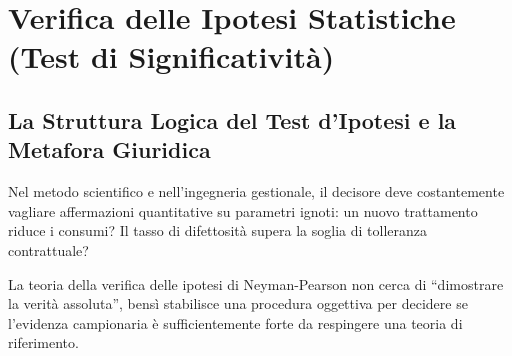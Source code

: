 \chapter{Verifica delle Ipotesi Statistiche (Test di Significatività)}
\label{cap:test_statistici}

\begin{abstract}
Il presente capitolo espone la teoria formale delle decisioni statistiche di Jerzy Neyman ed Egon Pearson. Si formalizza la dialettica tra ipotesi nulla ($H_0$) e ipotesi alternativa ($H_1$), chiarendo l'asimmetria ontologica tra le due posizioni mediante la celebre metafora giuridica del processo penale. Si analizza la matrice di contingenza degli errori decisionali (Errore di I tipo $\alpha$ ed Errore di II tipo $\beta$), definendo la funzione di potenza del test. Viene approfondito il concetto unificante di $p$-value e dimostrato il teorema di dualità strutturale che lega i test bilaterali agli intervalli di confidenza. Infine, si presenta la tassonomia operativa dei test parametrici $Z$ e $t$ per medie, proporzioni e confronti tra campioni indipendenti.
\end{abstract}

\section{La Struttura Logica del Test d'Ipotesi e la Metafora Giuridica}
\label{sec:struttura_logica_test}

Nel metodo scientifico e nell'ingegneria gestionale, il decisore deve costantemente vagliare affermazioni quantitative su parametri ignoti: un nuovo trattamento riduce i consumi? Il tasso di difettosità supera la soglia di tolleranza contrattuale? 

La teoria della verifica delle ipotesi di Neyman-Pearson non cerca di ``dimostrare la verità assoluta'', bensì stabilisce una procedura oggettiva per decidere se l'evidenza campionaria è sufficientemente forte da respingere una teoria di riferimento.

